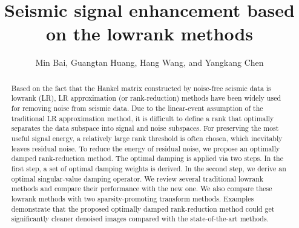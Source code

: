 
\title{Seismic signal enhancement based on the lowrank methods}
\author{Min Bai\footnotemark[1]\footnotemark[2], Guangtan Huang\footnotemark[1], Hang Wang\footnotemark[1], and Yangkang Chen\footnotemark[1]}

\renewcommand{\thefootnote}{\fnsymbol{footnote}}



\address{
\footnotemark[1]School of Earth Sciences\\
Zhejiang University\\
Hangzhou, Zhejiang Province, China, 310027\\
baimin2016@126.com \\
\footnotemark[2]
Key Laboratory of Exploration Technology for Oil and Gas Resources of Ministry of Education\\
Yangtze University\\
Wuhan, Hubei Province, China, 430100 \\
}


\DeclareRobustCommand{\dlo}[1]{}
\DeclareRobustCommand{\wen}[1]{#1}

\maketitle


\begin{abstract}
Based on the fact that the Hankel matrix constructed by noise-free seismic data is lowrank (LR), LR approximation (or rank-reduction) methods have been widely used for removing noise from seismic data. Due to the linear-event assumption of the traditional LR approximation method, it is difficult to define a rank that optimally separates the data subspace into signal and noise subspaces. For preserving the most useful signal energy, a relatively large rank threshold is often chosen, which inevitably leaves residual noise. To reduce the energy of residual noise, we propose an optimally damped rank-reduction method. The optimal damping is applied via two steps. In the first step, a set of optimal damping weights is derived. In the second step, we derive an optimal singular-value damping operator. We review several traditional lowrank methods and compare their performance with the new one. We also compare these lowrank methods with two sparsity-promoting transform methods. Examples demonstrate that the proposed optimally damped rank-reduction method could get significantly cleaner denoised images compared with the state-of-the-art methods.  \par
\end{abstract}

